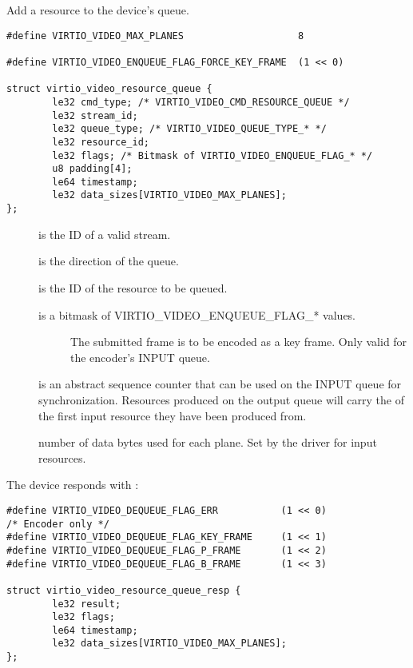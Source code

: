 Add a resource to the device's queue.

\begin{lstlisting}
#define VIRTIO_VIDEO_MAX_PLANES                    8

#define VIRTIO_VIDEO_ENQUEUE_FLAG_FORCE_KEY_FRAME  (1 << 0)

struct virtio_video_resource_queue {
        le32 cmd_type; /* VIRTIO_VIDEO_CMD_RESOURCE_QUEUE */
        le32 stream_id;
        le32 queue_type; /* VIRTIO_VIDEO_QUEUE_TYPE_* */
        le32 resource_id;
        le32 flags; /* Bitmask of VIRTIO_VIDEO_ENQUEUE_FLAG_* */
        u8 padding[4];
        le64 timestamp;
        le32 data_sizes[VIRTIO_VIDEO_MAX_PLANES];
};
\end{lstlisting}

\begin{description}
\item[]
is the ID of a valid stream.
\item[]
is the direction of the queue.
\item[]
is the ID of the resource to be queued.
\item[]
is a bitmask of VIRTIO_VIDEO_ENQUEUE_FLAG_* values.

\begin{description}
\item[]
The submitted frame is to be encoded as a key frame. Only valid for the
encoder's INPUT queue.
\end{description}
\item[]
is an abstract sequence counter that can be used on the INPUT queue for
synchronization. Resources produced on the output queue will carry the
 of the first input resource they have been produced
from.
\item[]
number of data bytes used for each plane. Set by the driver for input
resources.
\end{description}

The device responds with
:

\begin{lstlisting}
#define VIRTIO_VIDEO_DEQUEUE_FLAG_ERR           (1 << 0)
/* Encoder only */
#define VIRTIO_VIDEO_DEQUEUE_FLAG_KEY_FRAME     (1 << 1)
#define VIRTIO_VIDEO_DEQUEUE_FLAG_P_FRAME       (1 << 2)
#define VIRTIO_VIDEO_DEQUEUE_FLAG_B_FRAME       (1 << 3)

struct virtio_video_resource_queue_resp {
        le32 result;
        le32 flags;
        le64 timestamp;
        le32 data_sizes[VIRTIO_VIDEO_MAX_PLANES];
};
\end{lstlisting}

